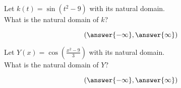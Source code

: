 \documentclass{ximera}
\begin{document}
\begin{exercise}
\begin{question}


Let $k(t) = \sin(t^2 - 9)$ with its natural domain. \\

What is the natural domain of $k$?

\[
\left( \answer{-\infty},  \answer{\infty}  \right)
\]


\end{question}












\begin{question}


Let $Y(x) = \cos\left( \frac{x^2 - 9}{3} \right)$ with its natural domain. \\

What is the natural domain of $Y$?

\[
\left( \answer{-\infty}, \answer{\infty}  \right)
\]


\end{question}













\end{exercise}
\end{document}
